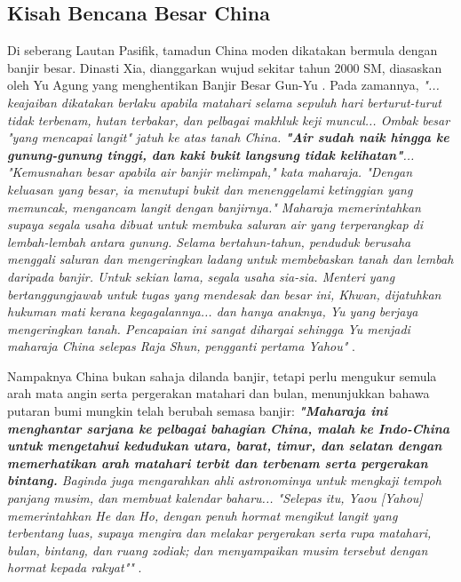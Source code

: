 \documentclass[10pt,twocolumn,letterpaper]{article}
\begin{document}
\subsection{Kisah Bencana Besar China}

Di seberang Lautan Pasifik, tamadun China moden dikatakan bermula dengan banjir besar. Dinasti Xia, dianggarkan wujud sekitar tahun 2000 SM, diasaskan oleh Yu Agung yang menghentikan Banjir Besar Gun-Yu \cite{6}. Pada zamannya, \textit{"... keajaiban dikatakan berlaku apabila matahari selama sepuluh hari berturut-turut tidak terbenam, hutan terbakar, dan pelbagai makhluk keji muncul... Ombak besar "yang mencapai langit" jatuh ke atas tanah China. \textbf{"Air sudah naik hingga ke gunung-gunung tinggi, dan kaki bukit langsung tidak kelihatan"}... "Kemusnahan besar apabila air banjir melimpah," kata maharaja. "Dengan keluasan yang besar, ia menutupi bukit dan menenggelami ketinggian yang memuncak, mengancam langit dengan banjirnya." Maharaja memerintahkan supaya segala usaha dibuat untuk membuka saluran air yang terperangkap di lembah-lembah antara gunung. Selama bertahun-tahun, penduduk berusaha menggali saluran dan mengeringkan ladang untuk membebaskan tanah dan lembah daripada banjir. Untuk sekian lama, segala usaha sia-sia. Menteri yang bertanggungjawab untuk tugas yang mendesak dan besar ini, Khwan, dijatuhkan hukuman mati kerana kegagalannya... dan hanya anaknya, Yu yang berjaya mengeringkan tanah. Pencapaian ini sangat dihargai sehingga Yu menjadi maharaja China selepas Raja Shun, pengganti pertama Yahou"} \cite{5}.

Nampaknya China bukan sahaja dilanda banjir, tetapi perlu mengukur semula arah mata angin serta pergerakan matahari dan bulan, menunjukkan bahawa putaran bumi mungkin telah berubah semasa banjir: \textit{\textbf{"Maharaja ini menghantar sarjana ke pelbagai bahagian China, malah ke Indo-China untuk mengetahui kedudukan utara, barat, timur, dan selatan dengan memerhatikan arah matahari terbit dan terbenam serta pergerakan bintang.} Baginda juga mengarahkan ahli astronominya untuk mengkaji tempoh panjang musim, dan membuat kalendar baharu... "Selepas itu, Yaou [Yahou] memerintahkan He dan Ho, dengan penuh hormat mengikut langit yang terbentang luas, supaya mengira dan melakar pergerakan serta rupa matahari, bulan, bintang, dan ruang zodiak; dan menyampaikan musim tersebut dengan hormat kepada rakyat""} \cite{5}.
\end{document}
